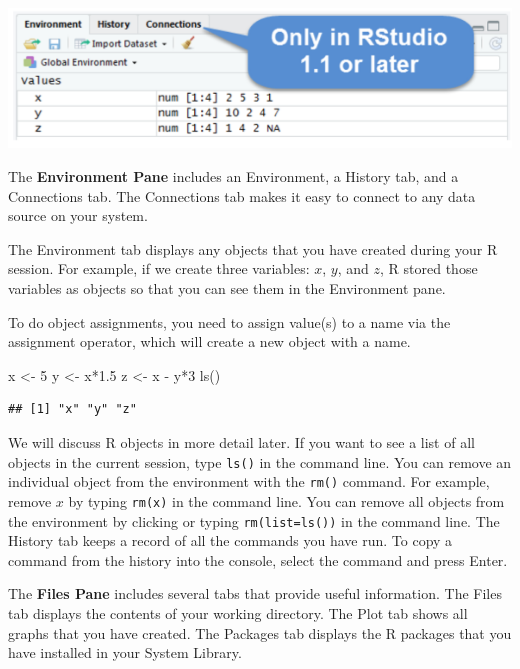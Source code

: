 \documentclass[
]{book}
\newenvironment{Shaded}{\begin{snugshade}}{\end{snugshade}}
\newcommand{\DecValTok}[1]{\textcolor[rgb]{0.00,0.00,0.81}{#1}}
\newcommand{\FloatTok}[1]{\textcolor[rgb]{0.00,0.00,0.81}{#1}}
\newcommand{\FunctionTok}[1]{\textcolor[rgb]{0.00,0.00,0.00}{#1}}
\newcommand{\NormalTok}[1]{#1}
\newcommand{\OtherTok}[1]{\textcolor[rgb]{0.56,0.35,0.01}{#1}}
\newcommand{\SpecialCharTok}[1]{\textcolor[rgb]{0.00,0.00,0.00}{#1}}
\theoremstyle{definition}
\theoremstyle{definition}
\theoremstyle{definition}
\theoremstyle{definition}
\theoremstyle{remark}
\begin{document}
\includegraphics[width=8.12in]{png/Rstudio3}

The \textbf{Environment Pane} includes an Environment, a History tab, and a Connections tab. The Connections tab makes it easy to connect to any data source on your system.

The Environment tab displays any objects that you have created during your R session. For example, if we create three variables: \(x\), \(y\), and \(z\), R stored those variables as objects so that you can see them in the Environment pane.

To do object assignments, you need to assign value(s) to a name via the assignment operator, which will create a new object with a name.

\begin{Shaded}
\begin{Highlighting}[]
\NormalTok{x }\OtherTok{\textless{}{-}} \DecValTok{5}
\NormalTok{y }\OtherTok{\textless{}{-}}\NormalTok{ x}\SpecialCharTok{*}\FloatTok{1.5}
\NormalTok{z }\OtherTok{\textless{}{-}}\NormalTok{ x }\SpecialCharTok{{-}}\NormalTok{ y}\SpecialCharTok{*}\DecValTok{3}
\FunctionTok{ls}\NormalTok{()}
\end{Highlighting}
\end{Shaded}

\begin{verbatim}
## [1] "x" "y" "z"
\end{verbatim}

We will discuss R objects in more detail later. If you want to see a list of all objects in the current session, type \texttt{ls()} in the command line. You can remove an individual object from the environment with the \texttt{rm()} command. For example, remove \(x\) by typing \texttt{rm(x)} in the command line. You can remove all objects from the environment by clicking or typing \texttt{rm(list=ls())} in the command line. The History tab keeps a record of all the commands you have run. To copy a command from the history into the console, select the command and press Enter.

The \textbf{Files Pane} includes several tabs that provide useful information. The Files tab displays the contents of your working directory. The Plot tab shows all graphs that you have created. The Packages tab displays the R packages that you have installed in your System Library.
\end{document}
